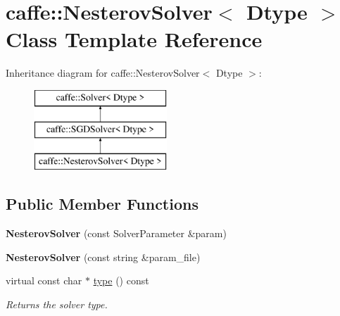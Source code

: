 \hypertarget{classcaffe_1_1NesterovSolver}{}\section{caffe\+:\+:Nesterov\+Solver$<$ Dtype $>$ Class Template Reference}
\label{classcaffe_1_1NesterovSolver}
Inheritance diagram for caffe\+:\+:Nesterov\+Solver$<$ Dtype $>$\+:\begin{figure}[H]
\begin{center}
\leavevmode
\includegraphics[height=3.000000cm]{classcaffe_1_1NesterovSolver}
\end{center}
\end{figure}
\subsection*{Public Member Functions}
\begin{DoxyCompactItemize}
\item 
{\bfseries Nesterov\+Solver} (const Solver\+Parameter \&param)\hypertarget{classcaffe_1_1NesterovSolver_aa4c7f611c593d0b62dafa3167e3e9004}{}\label{classcaffe_1_1NesterovSolver_aa4c7f611c593d0b62dafa3167e3e9004}

\item 
{\bfseries Nesterov\+Solver} (const string \&param\+\_\+file)\hypertarget{classcaffe_1_1NesterovSolver_afed2e1d70d4952228e63c996f1aa22a8}{}\label{classcaffe_1_1NesterovSolver_afed2e1d70d4952228e63c996f1aa22a8}

\item 
virtual const char $\ast$ \hyperlink{classcaffe_1_1NesterovSolver_af7dc1d6bd1aaf42f52f0a79ecbfac76b}{type} () const \hypertarget{classcaffe_1_1NesterovSolver_af7dc1d6bd1aaf42f52f0a79ecbfac76b}{}\label{classcaffe_1_1NesterovSolver_af7dc1d6bd1aaf42f52f0a79ecbfac76b}

\begin{DoxyCompactList}\small\item\em Returns the solver type. \end{DoxyCompactList}\end{DoxyCompactItemize}
